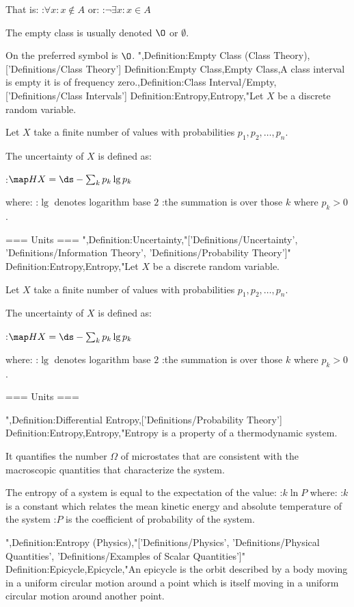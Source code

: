 That is:
:$\forall x: x \notin A$
or:
:$\neg \exists x: x \in A$


The empty class is usually denoted $\O$ or $\emptyset$.

On  the preferred symbol is $\O$.
",Definition:Empty Class (Class Theory),['Definitions/Class Theory']
Definition:Empty Class,Empty Class,A class interval is empty  it is of frequency zero.,Definition:Class Interval/Empty,['Definitions/Class Intervals']
Definition:Entropy,Entropy,"Let $X$ be a discrete random variable.

Let $X$ take a finite number of values with probabilities $p_1, p_2, \dotsc, p_n$.


The uncertainty of $X$ is defined as:

:$\map H X = \ds -\sum_k p_k \lg p_k$

where:
:$\lg$ denotes logarithm base $2$
:the summation is over those $k$ where $p_k > 0$.


=== Units ===
",Definition:Uncertainty,"['Definitions/Uncertainty', 'Definitions/Information Theory', 'Definitions/Probability Theory']"
Definition:Entropy,Entropy,"Let $X$ be a discrete random variable.

Let $X$ take a finite number of values with probabilities $p_1, p_2, \dotsc, p_n$.


The uncertainty of $X$ is defined as:

:$\map H X = \ds -\sum_k p_k \lg p_k$

where:
:$\lg$ denotes logarithm base $2$
:the summation is over those $k$ where $p_k > 0$.


=== Units ===

",Definition:Differential Entropy,['Definitions/Probability Theory']
Definition:Entropy,Entropy,"Entropy is a property of a thermodynamic system.

It quantifies the number $\Omega$ of microstates that are consistent with the macroscopic quantities that characterize the system.


The entropy of a system is equal to the expectation of the value:
:$k \ln P$
where:
:$k$ is a constant which relates the mean kinetic energy and absolute temperature of the system
:$P$ is the coefficient of probability of the system.



",Definition:Entropy (Physics),"['Definitions/Physics', 'Definitions/Physical Quantities', 'Definitions/Examples of Scalar Quantities']"
Definition:Epicycle,Epicycle,"An epicycle is the orbit described by a body moving in a uniform circular motion around a point which is itself moving in a uniform circular motion around another point.


